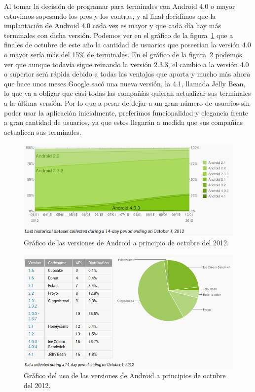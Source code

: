 Al tomar la decisión de programar para terminales con Android 4.0 o mayor estuvimos sopesando los pros y los contras, y al final decidimos que la implantación de Android 4.0 cada vez es mayor y que cada día hay más terminales con dicha versión. Podemos ver en el gráfico de la figura~\ref{fig:graficoEvolucionAndroid} que a finales de octubre de este año la cantidad de usuarios que poseerían la versión 4.0 o mayor sería más del 15\% de terminales. En el gráfico de la figura~\ref{fig:graficoUsoAndroid} podemos ver que aunque todavía sigue reinando la versión 2.3.3, el cambio a la versión 4.0 o superior será rápida debido a todas las ventajas que aporta y mucho más ahora que hace unos meses Google sacó una nueva versión, la 4.1, llamada Jelly Bean, lo que va a obligar que casi todas las compañías quieran actualizar sus terminales a la última versión. Por lo que a pesar de dejar a un gran número de usuarios sin poder usar la aplicación inicialmente, preferimos funcionalidad y elegancia frente a gran cantidad de usuarios, ya que estos llegarán a medida que sus compañías actualicen sus terminales.


\begin{figure}
  \centering
    \includegraphics[scale=0.8]{./Introduccion/imagenes/graficoEvolucionAndroid.png}
  \caption{Gráfico de las versiones de Android a principio de octubre del 2012.}
  \label{fig:graficoEvolucionAndroid}
\end{figure}

\begin{figure}
  \centering
    \includegraphics[scale=0.5]{./Introduccion/imagenes/graficoUsoAndroid.png}
  \caption{Gráfico del uso de las versiones de Android a principios de octubre del 2012.}
  \label{fig:graficoUsoAndroid}
\end{figure}

